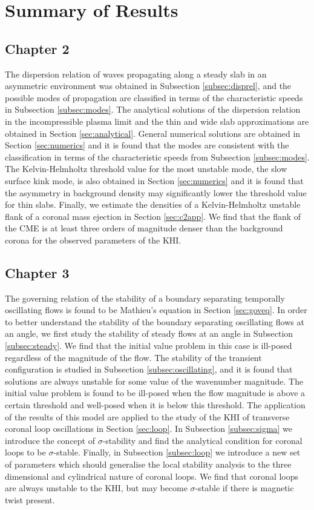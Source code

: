 \documentclass[12pt]{ociamthesis}
\begin{document}
\section{Summary of Results}

\subsection{Chapter 2}

The dispersion relation of waves propagating along a steady slab in an asymmetric environment was obtained in Subsection \ref{subsec:disprel}, and the possible modes of propagation are classified in terms of the characteristic speeds in Subsection \ref{subsec:modes}.
The analytical solutions of the dispersion relation in the incompressible plasma limit and the thin and wide slab approximations are obtained in Section \ref{sec:analytical}.
General numerical solutions are obtained in Section \ref{sec:numerics} and it is found that the modes are consistent with the classification in terms of the characteristic speeds from Subsection \ref{subsec:modes}.
The Kelvin-Helmholtz threshold value for the most unstable mode, the slow surface kink mode, is also obtained in Section \ref{sec:numerics} and it is found that the asymmetry in background density may significantly lower the threshold value for thin slabs.
Finally, we estimate the densities of a Kelvin-Helmholtz unstable flank of a coronal mass ejection in Section \ref{sec:c2app}.
We find that the flank of the CME is at least three orders of magnitude denser than the background corona for the observed parameters of the KHI.

\subsection{Chapter 3}

The governing relation of the stability of a boundary separating temporally oscillating flows is found to be Mathieu's equation in Section \ref{sec:goveq}.
In order to better understand the stability of the boundary separating oscillating flows at an angle, we first study the stability of steady flows at an angle in Subsection \ref{subsec:steady}.
We find that the initial value problem in this case is ill-posed regardless of the magnitude of the flow.
The stability of the transient configuration is studied in Subsection \ref{subsec:oscillating}, and it is found that solutions are always unstable for some value of the wavenumber magnitude.
The initial value problem is found to be ill-posed when the flow magnitude is above a certain threshold and well-posed when it is below this threshold.
The application of the results of this model are applied to the study of the KHI of transverse coronal loop oscillations in Section \ref{sec:loop}.
In Subsection \ref{subsec:sigma} we introduce the concept of $\sigma$-stability and find the analytical condition for coronal loops to be $\sigma$-stable.
Finally, in Subsection \ref{subsec:loop} we introduce a new set of parameters which should generalise the local stability analysis to the three dimensional and cylindrical nature of coronal loops.
We find that coronal loops are always unstable to the KHI, but may become $\sigma$-stable if there is magnetic twist present.
\end{document}
